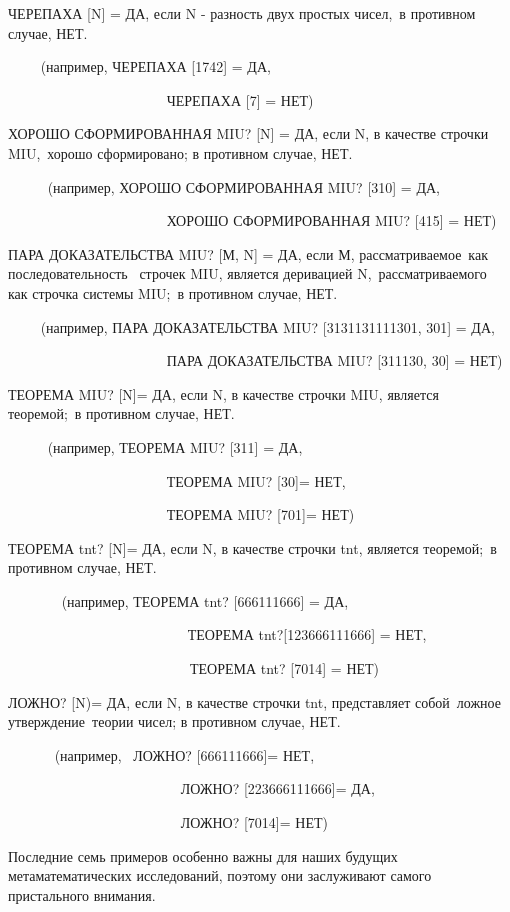 \documentclass[../main.tex]{subfiles}
\begin{document}
ЧЕРЕПАХА {[}N{]} = ДА, если N - разность двух простых чисел,~в противном случае, НЕТ.

~~~~ (например, ЧЕРЕПАХА {[}1742{]} = ДА,

~~~~~~~~~~~~~~~~~~~~~~ ЧЕРЕПАХА {[}7{]} = НЕТ)

ХОРОШО СФОРМИРОВАННАЯ MIU? {[}N{]} = ДА, если N, в качестве строчки MIU,~хорошо сформировано; в противном случае, НЕТ.

~~~~~ (например, ХОРОШО СФОРМИРОВАННАЯ MIU? {[}310{]} = ДА,

~~~~~~~~~~~~~~~~~~~~~~ ХОРОШО СФОРМИРОВАННАЯ MIU? {[}415{]} = НЕТ)

ПАРА ДОКАЗАТЕЛЬСТВА MIU? {[}М, N{]} = ДА, если М, рассматриваемое~как~ последовательность~ строчек MIU, является деривацией N,~рассматриваемого~ как строчка системы MIU;~в противном случае, НЕТ.

~~~~ (например, ПАРА ДОКАЗАТЕЛЬСТВА MIU? {[}3131131111301, 301{]} = ДА,

~~~~~~~~~~~~~~~~~~~~~~ ПАРА ДОКАЗАТЕЛЬСТВА MIU? {[}311130, 30{]} = НЕТ)

ТЕОРЕМА MIU? {[}N{]}= ДА, если N, в качестве строчки MIU, является теоремой;~в противном случае, НЕТ.

~~~~~ (например, ТЕОРЕМА MIU? {[}311{]} = ДА,

~~~~~~~~~~~~~~~~~~~~~~ ТЕОРЕМА MIU? {[}30{]}= НЕТ,

~~~~~~~~~~~~~~~~~~~~~ ~ТЕОРЕМА MIU? {[}701{]}= НЕТ)

ТЕОРЕМА \acs{tnt}? {[}N{]}= ДА, если N, в качестве строчки \acs{tnt}, является теоремой;~в противном случае, НЕТ.

~~~~~~~ (например, ТЕОРЕМА \acs{tnt}? {[}666111666{]} = ДА,

~~~~~~~~~~~~~~~~~~~~~~~~~ ТЕОРЕМА \acs{tnt}?{[}123666111666{]} = НЕТ,

~~~~~~~~~~~~~~~~~~~~~~~~~~ТЕОРЕМА \acs{tnt}? {[}7014{]} = НЕТ)

ЛОЖНО? {[}N)= ДА, если N, в качестве строчки \acs{tnt}, представляет собой~ложное утверждение~теории чисел; в противном случае, НЕТ.

~~~~~~ (например,~ ЛОЖНО? {[}666111666{]}= НЕТ,

~~~~~~~~~~~~~~~~~~~~~~~~ ЛОЖНО? {[}223666111666{]}= ДА,

~~~~~~~~~~~~~~~~~~~~~~~ ~ЛОЖНО? {[}7014{]}= НЕТ)

Последние семь примеров особенно важны для наших будущих метаматематических исследований, поэтому они заслуживают самого пристального внимания.
\end{document}
